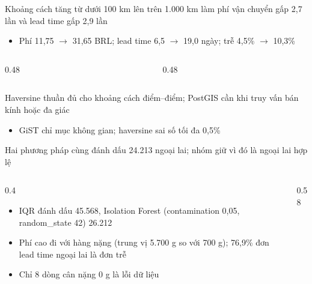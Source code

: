\begin{frame}{Khoảng cách tăng từ dưới 100 km lên trên 1.000 km làm phí vận chuyển gấp 2,7 lần và lead time gấp 2,9 lần}
\begin{itemize}
  \item Phí 11,75 $\rightarrow$ 31,65 BRL; lead time 6,5 $\rightarrow$ 19,0 ngày; trễ 4,5\% $\rightarrow$ 10,3\%
\end{itemize}
\begin{columns}[c]\begin{column}{0.48\textwidth}\end{column}\begin{column}{0.48\textwidth}\end{column}\end{columns}

\end{frame}

\begin{frame}{Haversine thuần đủ cho khoảng cách điểm–điểm; PostGIS cần khi truy vấn bán kính hoặc đa giác}
\begin{itemize}
  \item GiST chỉ mục không gian; haversine sai số tối đa 0,5\%
\end{itemize}

\end{frame}

\begin{frame}{Hai phương pháp cùng đánh dấu 24.213 ngoại lai; nhóm giữ vì đó là ngoại lai hợp lệ}
\begin{columns}[T]\begin{column}{0.4\textwidth}
\begin{itemize}
  \item IQR đánh dấu 45.568, Isolation Forest (contamination 0,05, random\_state 42) 26.212
  \item Phí cao đi với hàng nặng (trung vị 5.700 g so với 700 g); 76,9\% đơn lead time ngoại lai là đơn trễ
  \item Chỉ 8 dòng cân nặng 0 g là lỗi dữ liệu
\end{itemize}
\end{column}\begin{column}{0.58\textwidth}
\begin{center}\end{center}
\end{column}\end{columns}

\end{frame}


